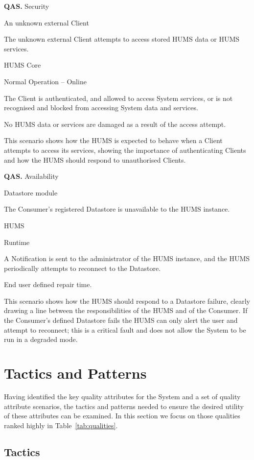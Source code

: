 \documentclass[10pt,a4paper]{article}
\newcommand{\qas}[1]{\textcolor{reqColor}{\textbf{QAS.#1}}}
\newenvironment{scenario}[1]{
\newcommand{\source}[1]{\item[Source of Stimulus:] ##1}
\newcommand{\stimulus}[1]{\item[Stimulus:] ##1}
\newcommand{\artifact}[1]{\item[Artifact:] ##1}
\newcommand{\environment}[1]{\item[Environment:] ##1}
\newcommand{\response}[1]{\item[Response:] ##1}
\newcommand{\measure}[1]{\item[Response Measure:] ##1}
\newcommand{\rationale}[1]{\item[Scenario Rationale:] ##1}
\newcommand{\quality}[1]{\item[Quality:] ##1}
		\begin{description} [noitemsep]	
		\item[Scenario ID:] \qas{#1}
		}{\end{description} \vspace*{0.3cm}
		}
\begin{document}
\begin{scenario}{3}
\quality{Security}
\source{An unknown external Client}
\stimulus{The unknown external Client attempts to access stored HUMS data or HUMS services.}
\artifact{HUMS Core}
\environment{Normal Operation -- Online}
\response{The Client is authenticated, and allowed to access System services, or is not recognised and blocked from accessing System data and services.}
\measure{No HUMS data or services are damaged as a result of the access attempt.}
\rationale{This scenario shows how the HUMS is expected to behave when a Client attempts to access its services, showing the importance of authenticating Clients and how the HUMS should respond to unauthorised Clients.}
\end{scenario}

\begin{scenario}{4}
\quality{Availability}
\source{Datastore module}
\stimulus{The Consumer's registered Datastore is unavailable to the HUMS instance.}
\artifact{HUMS}
\environment{Runtime}
\response{A Notification is sent to the administrator of the HUMS instance, and the HUMS periodically attempts to reconnect to the Datastore.}
\measure{End user defined repair time.}
\rationale{This scenario shows how the HUMS should respond to a Datastore failure, clearly drawing a line between the responsibilities of the HUMS and of the Consumer. If the Consumer's defined Datastore fails the HUMS can only alert the user and attempt to reconnect; this is a critical fault and does not allow the System to be run in a degraded mode.}
\end{scenario}



\section{Tactics and Patterns}
\label{sec:tactics}
Having identified the key quality attributes for the System and a set of quality attribute scenarios, the tactics and patterns needed to ensure the desired utility of these attributes can be examined. In this section we focus on those qualities ranked highly in Table~\ref{tab:qualities}.

\subsection{Tactics}
\end{document}
